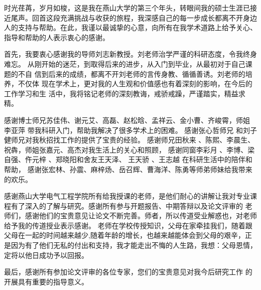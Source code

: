 \makeatletter
{}
  \pagestyle{fancy}%
  \fancyhf{}
\makeatother

\begin{thanks}
\begin{comment}
\end{comment}
时光荏苒，岁月如梭，这是我在燕山大学的第三个年头，转眼间我的硕士生涯已接近尾声。回首这段充满挑战与收获的旅程，我深感自己的每一步成长都离不开身边人的支持与帮助。在此，我谨以最诚挚的心意，向所有在我学术道路上给予关心、指导和帮助的人表示衷心的感谢。

首先，我要衷心感谢我的导师刘志新教授。刘老师治学严谨的科研态度，令我终身难忘。
从刚开始的迷茫，到取得后来的进步，从入门到毕业，从最初对于自己课题的不自
信到后来的成绩，都离不开刘老师的言传身教、循循善诱。刘老师的培养，不仅体
现在学术上，更对我的人生观和价值感也有着深刻的影响，在今后的工作学习和生
活中，我将铭记老师的深刻教诲，戒骄戒躁，严谨踏实，精益求精。

 感谢博士师兄苏佳伟、谢元艾、高磊、赵松晗、孟祥云、金小曹、齐峻霄，师姐 李亚萍 带我科研入门，帮助我解决了很多学术上的困难。
 感谢张心哲师兄  和刘子健师兄对我秋招找工作的提供了宝贵的经验。
 感谢师兄田秋来 、陈熙、李晨生、祝犇，师姐张嘉元、高杰对我生活上的关心和照顾，
 感谢同窗李彩月 、李博、梁自强、仵元梓 、郑晓阳和舍友王天泽、 王天骄 、王志越  在科研生活中的陪伴和帮助，%
 感谢张宏林、孙震、麻梓炀、岳召辉、曹海洋、陈勇等师弟师妹给我带来的欢乐。

 感谢燕山大学电气工程学院所有给我授课的老师，是他们耐心的讲解让我对专业课程有了深入的了解与研究。感谢所有参与开题报告、中期答辩以及论文评审的
老师们，感谢他们的宝贵意见让论文不断完善。师者，所以传道受业解惑也，对老师给予我的传道授业表示感谢。
老师在学校传授知识，父母在家牵挂我们，随着跟父母在一起的时间越来越少,随着年龄的增长，也越来越能体会到父母的艰辛，正是因为有了他们无私的付出和支持，我才能走出不悔的人生路，我想：父母恩情，定将以他日成功予以回报。

最后，感谢所有参加论文评审的各位专家，您们的宝贵意见对我今后研究工作
的开展具有重要的指导意义。


\end{thanks}
